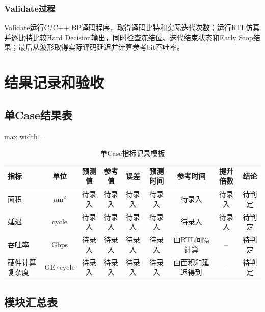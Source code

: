\documentclass[a4paper,oneside,11pt]{ctexrep}
\newcommand{\metricheader}[1]{\textbf{#1}}
\begin{document}
\subsection{Validate过程}

Validate运行C/C++ BP译码程序，取得译码比特和实际迭代次数；运行RTL仿真并逐比特比较Hard Decision输出，同时检查冻结位、迭代结束状态和Early Stop结果；最后从波形取得实际译码延迟并计算参考bit吞吐率。

\chapter{结果记录和验收}

\section{单Case结果表}

\begin{table}[H]
    \centering
    \scriptsize
    \begin{adjustbox}{max width=\textwidth}
    \begin{tabular}{lcccccccc}
        \toprule
        \metricheader{指标} & \metricheader{单位} & \metricheader{预测值} & \metricheader{参考值} & \metricheader{误差} & \metricheader{预测时间} & \metricheader{参考时间} & \metricheader{提升倍数} & \metricheader{结论} \\
        \midrule
        面积 & $\mu\mathrm{m}^{2}$ & 待录入 & 待录入 & 待录入 & 待录入 & 待录入 & 待录入 & 待判定 \\
        延迟 & cycle & 待录入 & 待录入 & 待录入 & 待录入 & 待录入 & 待录入 & 待判定 \\
        吞吐率 & Gbps & 待录入 & 待录入 & 待录入 & 待录入 & 由RTL间隔计算 & -- & 待判定 \\
        硬件计算复杂度 & $\mathrm{GE\cdot cycle}$ & 待录入 & 待录入 & 待录入 & 待录入 & 由面积和延迟得到 & -- & 待判定 \\
        \bottomrule
    \end{tabular}
    \end{adjustbox}
    \caption{单Case指标记录模板}
\end{table}

\section{模块汇总表}
\end{document}
